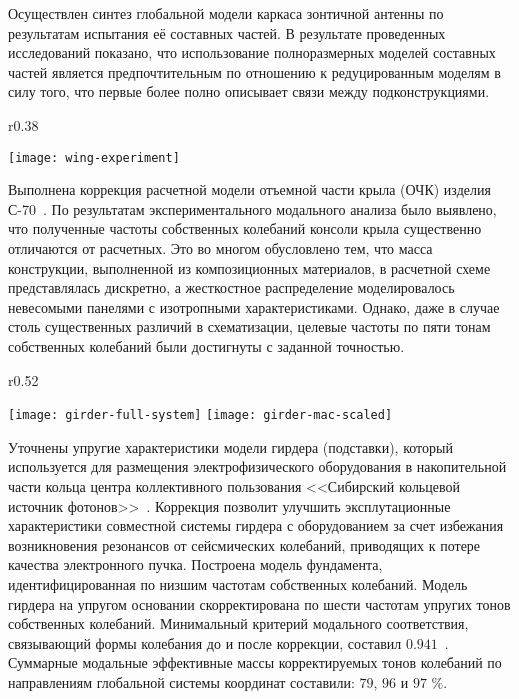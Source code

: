 Осуществлен синтез глобальной модели каркаса зонтичной антенны по результатам испытания её составных частей. В результате проведенных исследований показано, что использование полноразмерных моделей составных частей является предпочтительным по отношению к редуцированным моделям в силу того, что первые более полно описывает связи между подконструкциями.

\begin{wrapfigure}[12]{r}{0.38\textwidth}
	\begin{center}
		\vspace{-1em}
		\texttt{[image: wing-experiment]} 
		 \label{fig:wing-experiment}
	\end{center}
\end{wrapfigure}

Выполнена коррекция расчетной модели отъемной части крыла (ОЧК) изделия \mbox{С-70}~. По результатам экспериментального модального анализа было выявлено, что полученные частоты собственных колебаний консоли крыла существенно отличаются от расчетных. Это во многом обусловлено тем, что масса конструкции, выполненной из композиционных материалов, в расчетной схеме представлялась дискретно, а жесткостное распределение моделировалось невесомыми панелями с изотропными характеристиками. Однако, даже в случае столь существенных различий в схематизации, целевые частоты по пяти тонам собственных колебаний были достигнуты с заданной точностью. 

\begin{wrapfigure}[27]{r}{0.52\textwidth}
	\begin{center}
		\vspace{-1.5em}
		\texttt{[image: girder-full-system]} 
		 \label{fig:girder-experiment}
		\vspace{1.25em}
		\texttt{[image: girder-mac-scaled]}
		 \label{fig:girder-mac}
	\end{center}
\end{wrapfigure}

Уточнены упругие характеристики модели гирдера (подставки), который используется для размещения электрофизического оборудования в накопительной части кольца центра коллективного пользования <<Сибирский кольцевой источник фотонов>>~. Коррекция позволит улучшить эксплутационные характеристики совместной системы гирдера с оборудованием за счет избежания возникновения резонансов от сейсмических колебаний, приводящих к потере качества электронного пучка. Построена модель фундамента, идентифицированная по низшим частотам собственных колебаний. Модель гирдера на упругом основании скорректирована по шести частотам упругих тонов собственных колебаний. Минимальный критерий модального соответствия, связывающий формы колебания до и после коррекции, составил $ 0.941 $~. Суммарные модальные эффективные массы корректируемых тонов колебаний по направлениям глобальной системы координат составили: $ 79 $, $ 96 $ и $ 97 $ \%. 